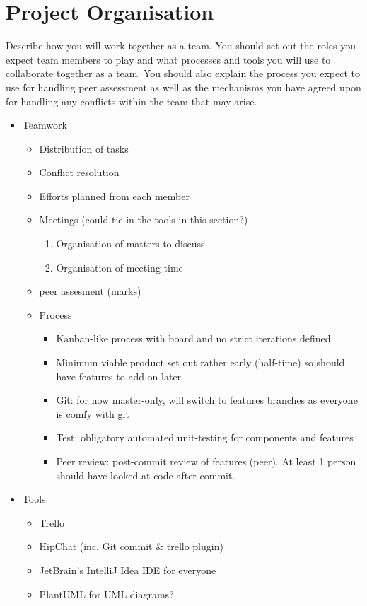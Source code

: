 \section{Project Organisation} %
Describe how you will work together as a team. You should set out the roles you expect team members to play and what
processes and tools you will use to collaborate together as a team. You should also explain the process you expect to
use for handling peer assessment as well as the mechanisms you have agreed upon for handling any conflicts within the
team that may arise.

\begin{itemize}
	\item Teamwork
	\begin{itemize}
		\item Distribution of tasks
    	\item Conflict resolution
    	\item Efforts planned from each member
    	\item Meetings (could tie in the tools in this section?)
        \begin{enumerate}
            \item Organisation of matters to discuss
            \item Organisation of meeting time
        \end{enumerate}
        \item peer assesment (marks)

        \item Process
        \begin{itemize}
            \item Kanban-like process with board and no strict iterations defined
            \item Minimum viable product set out rather early (half-time) so should have features to add on later
            \item Git: for now master-only, will switch to features branches as everyone is comfy with git
            \item Test: obligatory automated unit-testing for components and features
            \item Peer review: post-commit review of features (peer). At least 1 person should have looked at code after commit.
        \end{itemize}
	\end{itemize}

	\item Tools
	\begin{itemize}
		\item Trello
		\item HipChat (inc. Git commit & trello plugin)
	    \item JetBrain's IntelliJ Idea IDE for everyone
	    \item PlantUML for UML diagrams?
	\end{itemize}

\end{itemize}



